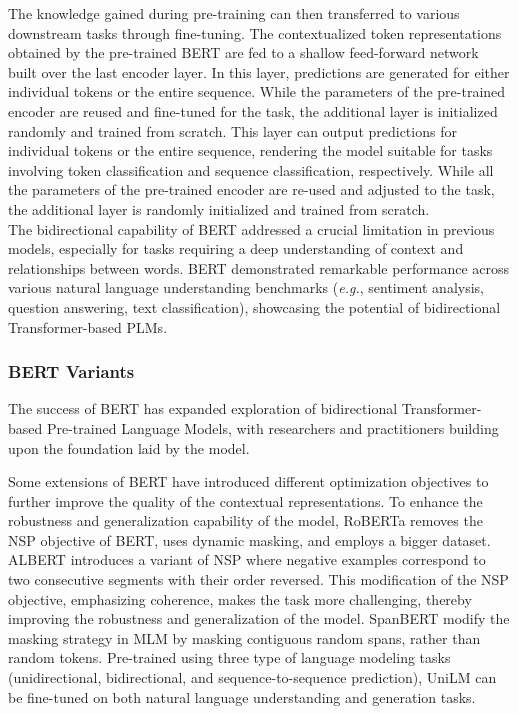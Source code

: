 The knowledge gained during pre-training can then transferred to various downstream tasks through fine-tuning. The contextualized token representations obtained by the pre-trained \ac{BERT} are fed to a shallow feed-forward network built over the last encoder layer. In this layer, predictions are generated for either individual tokens or the entire sequence. While the parameters of the pre-trained encoder are reused and fine-tuned for the task, the additional layer is initialized randomly and trained from scratch. This layer can output predictions for individual tokens or the entire sequence, rendering the model suitable for tasks involving token classification and sequence classification, respectively. While all the parameters of the pre-trained encoder are re-used and adjusted to the task, the additional layer is randomly initialized and trained from scratch. \\

The bidirectional capability of \ac{BERT} addressed a crucial limitation in previous models, especially for tasks requiring a deep understanding of context and relationships between words. \ac{BERT} demonstrated remarkable performance across various natural language understanding benchmarks (\textit{e.g.}, sentiment analysis, question answering, text classification), showcasing the potential of bidirectional Transformer-based PLMs.
 
\subsubsection{BERT Variants}

The success of \ac{BERT} has expanded exploration of bidirectional Transformer-based Pre-trained Language Models, with researchers and practitioners building upon the foundation laid by the model. 

Some extensions of \ac{BERT} have introduced different optimization objectives to further improve the quality of the contextual representations. To enhance the robustness and generalization capability of the model, \ac{RoBERTa} \citep{liu2019roberta} removes the \ac{NSP} objective of \ac{BERT}, uses dynamic masking, and employs a bigger dataset. \ac{ALBERT} \citep{lan2019albert} introduces a variant of \ac{NSP} where negative examples correspond to two consecutive segments with their order reversed. This modification of the \ac{NSP} objective, emphasizing coherence, makes the task more challenging, thereby improving the robustness and generalization of the model. SpanBERT \citep{joshi2020spanbert} modify the masking strategy in \ac{MLM} by masking contiguous random spans, rather than random tokens. Pre-trained using three type of language modeling tasks (unidirectional, bidirectional, and sequence-to-sequence prediction), UniLM \citep{dong2019unified} can be fine-tuned on both natural language understanding and generation tasks. 

